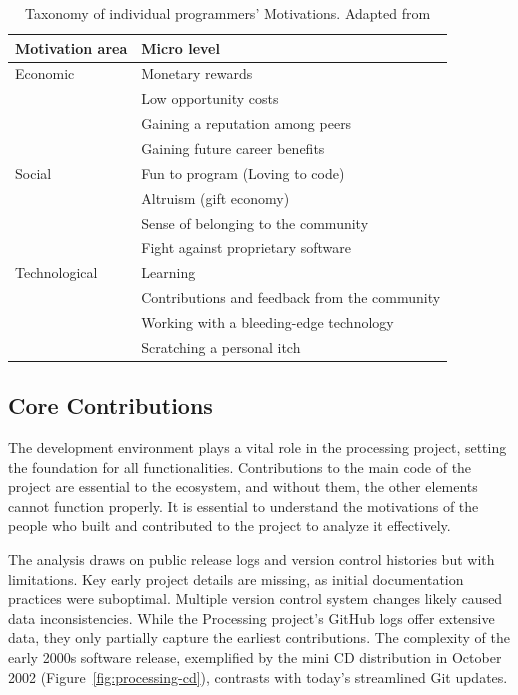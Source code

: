 \begin{table}
    \begin{tabularx}{\textwidth}{l l} 
    \toprule
    Motivation area & Micro level \\
    \midrule
    Economic & Monetary rewards \\
     & Low opportunity costs \\
     & Gaining a reputation among peers \\
     & Gaining future career benefits \\
    \midrule
    Social & Fun to program (Loving to code) \\
     & Altruism (gift economy) \\
     & Sense of belonging to the community \\
     & Fight against proprietary software \\
    \midrule
    Technological & Learning \\
     & Contributions and feedback from the community \\
     & Working with a bleeding-edge technology \\
     & Scratching a personal itch \\
    \bottomrule
    \end{tabularx} 
    \caption[Motivations taxonomy]{Taxonomy of individual programmers’ Motivations. Adapted from \parencite{bonaccorsiComparingMotivationsIndividual2006}}
    \label{tab:taxonomy}

\end{table}

\subsection{Core Contributions}
The development environment plays a vital role in the processing project, setting the foundation for all functionalities. Contributions to the main code of the project are essential to the ecosystem, and without them, the other elements cannot function properly. It is essential to understand the motivations of the people who built and contributed to the project to analyze it effectively.

The analysis draws on public release logs and version control histories but with limitations. Key early project details are missing, as initial documentation practices were suboptimal. Multiple version control system changes likely caused data inconsistencies. While the Processing project’s GitHub logs offer extensive data, they only partially capture the earliest contributions. The complexity of the early 2000s software release, exemplified by the mini CD distribution in October 2002 (Figure~\ref{fig:processing-cd}), contrasts with today’s streamlined Git updates.

